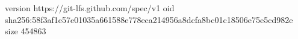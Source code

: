 version https://git-lfs.github.com/spec/v1
oid sha256:58f3af1e57e01035a661588e778eca214956a8dcfa8bc01c18506e75e5cd982e
size 454863
